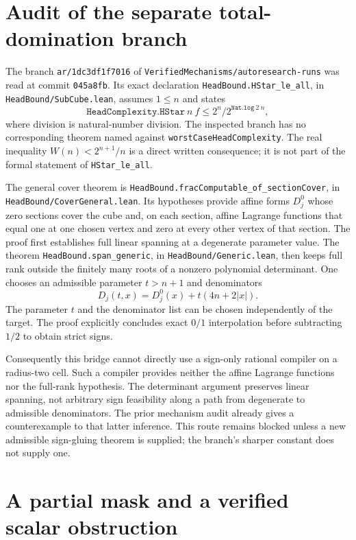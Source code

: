 \documentclass[11pt]{article}
\begin{document}
\section{Audit of the separate total-domination branch}

The branch \texttt{ar/1dc3df1f7016} of
\texttt{VerifiedMechanisms/autoresearch-runs} was read at commit
\texttt{045a8fb}. Its exact declaration
\texttt{HeadBound.HStar\_le\_all}, in
\texttt{HeadBound/SubCube.lean}, assumes $1\leq n$ and states
\[
 \texttt{HeadComplexity.HStar}\ n\ f
 \leq 2^n/2^{\texttt{Nat.log}\ 2\ n},
\]
where division is natural-number division. The inspected branch has no
corresponding theorem named against \texttt{worstCaseHeadComplexity}.
The real inequality $W(n)<2^{n+1}/n$ is a direct written consequence;
it is not part of the formal statement of \texttt{HStar\_le\_all}.

The general cover theorem is
\texttt{HeadBound.fracComputable\_of\_sectionCover}, in
\texttt{HeadBound/CoverGeneral.lean}. Its hypotheses provide affine
forms $D_j^0$ whose zero sections cover the cube and, on each section,
affine Lagrange functions that equal one at one chosen vertex and zero
at every other vertex of that section. The proof first establishes full
linear spanning at a degenerate parameter value. The theorem
\texttt{HeadBound.span\_generic}, in \texttt{HeadBound/Generic.lean},
then keeps full rank outside the finitely many roots of a nonzero
polynomial determinant. One chooses an admissible parameter $t>n+1$
and denominators
\[
 D_j(t,x)=D_j^0(x)+t(4n+2|x|).
\]
The parameter $t$ and the denominator list can be chosen independently
of the target. The proof explicitly concludes exact $0/1$ interpolation
before subtracting $1/2$ to obtain strict signs.

Consequently this bridge cannot directly use a sign-only rational
compiler on a radius-two cell. Such a compiler provides neither the
affine Lagrange functions nor the full-rank hypothesis. The determinant
argument preserves linear spanning, not arbitrary sign feasibility
along a path from degenerate to admissible denominators. The prior
mechanism audit already gives a counterexample to that latter inference.
This route remains blocked unless a new admissible sign-gluing theorem
is supplied; the branch's sharper constant does not supply one.

\section{A partial mask and a verified scalar obstruction}
\end{document}
